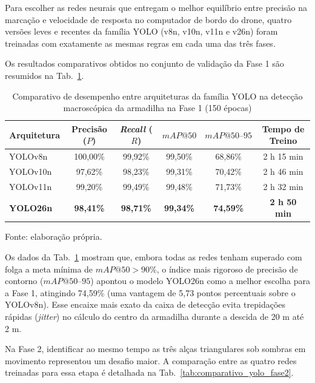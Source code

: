 Para escolher as redes neurais que entregam o melhor equilíbrio entre precisão na marcação e velocidade de resposta no computador de bordo do drone, quatro versões leves e recentes da família YOLO (v8n, v10n, v11n e v26n) foram treinadas com exatamente as mesmas regras em cada uma das três fases.

Os resultados comparativos obtidos no conjunto de validação da Fase 1 são resumidos na Tab.~\ref{tab:comparativo_yolo_fase1}.

\begin{table}[H]
	\centering
	\small
	\setlength{\tabcolsep}{5pt}
	\captionsetup{justification=centering}
	\caption{Comparativo de desempenho entre arquiteturas da família YOLO na detecção macroscópica da armadilha na Fase 1 (150 épocas)}
	\label{tab:comparativo_yolo_fase1}
	\vspace{0.2cm}
	\begin{tabular}{lccccc}
		\hline
		\textbf{Arquitetura} & \textbf{Precisão ($P$)} & \textbf{\textit{Recall} ($R$)} & \textbf{$mAP@50$} & \textbf{$mAP@50\text{--}95$} & \textbf{Tempo de Treino} \\
		\hline
		YOLOv8n  & 100,00\% & 99,92\% & 99,50\% & 68,86\% & 2 h 15 min \\
		YOLOv10n & 97,62\%  & 98,23\% & 99,31\% & 70,42\% & 2 h 46 min \\
		YOLOv11n & 99,20\%  & 99,49\% & 99,48\% & 71,73\% & 2 h 32 min \\
		\textbf{YOLO26n} & \textbf{98,41\%} & \textbf{98,71\%} & \textbf{99,34\%} & \textbf{74,59\%} & \textbf{2 h 50 min} \\
		\hline
	\end{tabular}
	\vspace{0.2cm}
	\begin{flushleft}
		\footnotesize Fonte: elaboração própria.
	\end{flushleft}
\end{table}

Os dados da Tab.~\ref{tab:comparativo_yolo_fase1} mostram que, embora todas as redes tenham superado com folga a meta mínima de $mAP@50 > 90\%$, o índice mais rigoroso de precisão de contorno ($mAP@50\text{--}95$) apontou o modelo YOLO26n como a melhor escolha para a Fase 1, atingindo 74,59\% (uma vantagem de 5,73 pontos percentuais sobre o YOLOv8n). Esse encaixe mais exato da caixa de detecção evita trepidações rápidas (\textit{jitter}) no cálculo do centro da armadilha durante a descida de 20 m até 2 m.

Na Fase 2, identificar ao mesmo tempo as três alças triangulares sob sombras em movimento representou um desafio maior. A comparação entre as quatro redes treinadas para essa etapa é detalhada na Tab.~\ref{tab:comparativo_yolo_fase2}.

